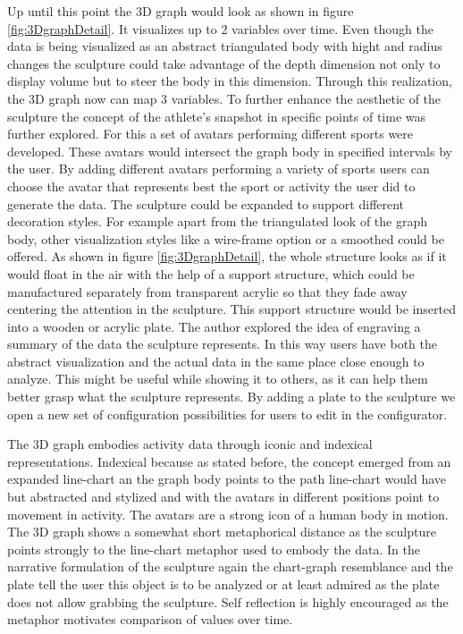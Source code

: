 \documentclass[../medieninformatik-arbeit.tex]{subfiles}
\begin{document}
Up until this point the 3D graph would look as shown in figure \ref{fig:3DgraphDetail}. It visualizes up to 2 variables over time. Even though the data is being visualized as an abstract triangulated body with hight and radius changes the sculpture could take advantage of the depth dimension not only to display volume but to steer the body in this dimension. Through this realization, the 3D graph now can map 3 variables. To further enhance the aesthetic of the sculpture the concept of the athlete's snapshot in specific points of time was further explored. For this a set of avatars performing different sports were developed. These avatars would intersect the graph body in specified intervals by the user. By adding different avatars performing a variety of sports users can choose the avatar that represents best the sport or activity the user did to generate the data. The sculpture could be expanded to support different decoration styles. For example apart from the triangulated look of the graph body, other visualization styles like a wire-frame option or a smoothed could be offered. 
As shown in figure \ref{fig:3DgraphDetail}, the whole structure looks as if it would float in the air with the help of a support structure, which could be manufactured separately from transparent acrylic  so that they fade away centering the attention in the sculpture. This support structure would be inserted into a wooden or acrylic plate. The author explored the idea of engraving a summary of the data the sculpture represents. In this way users have both the abstract visualization and the actual data in the same place close enough to analyze. This might be useful while showing it to others, as it can help them better grasp what the sculpture represents. By adding a plate to the sculpture we open a new set of configuration possibilities for users to edit in the configurator. 

The 3D graph embodies activity data through iconic and indexical representations. Indexical because as stated before, the concept emerged from an expanded line-chart an the graph body points to the path line-chart would have but abstracted and stylized and with the avatars in different positions point to movement in activity. The avatars are a strong icon of a human body in motion. The 3D graph shows a somewhat short metaphorical distance as the sculpture points strongly to  the line-chart metaphor used to embody the data. In the narrative formulation of the sculpture again the chart-graph resemblance and the plate tell the user this object is to be analyzed or at least admired as the plate does not allow grabbing the sculpture. Self reflection is highly encouraged as the metaphor motivates comparison of values over time. 
\end{document}
